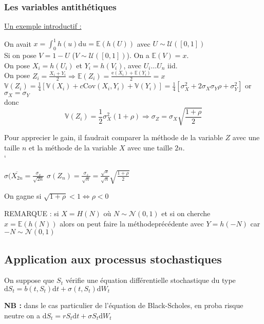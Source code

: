 \documentclass{report}
\newcommand{\E}{\mathbb{E}}
\newcommand{\Var}{\mathbb{V}}
\newcommand{\Cov}{\mathrm{Cov}}
\newcommand{\e}{\mbox{e}}
\newcommand{\dd}{\mathrm{d}}
\begin{document}
\subsubsection{Les variables antithétiques}
\underline{Un exemple introductif : }

\vspace{0.2cm}
On avait $x= \int_0^1h(u)\dd u = \E(h(U))$ avec $U\sim\mathcal{U}([0,1])$\\
Si on pose $V=1-U$ ($V\sim\mathcal{U}([0,1])$). On a $\E(V) = x$.\\
On pose $X_i = h(U_i)$ et $Y_i=h(V_i)$, avec $U_i\dots U_n$ iid.\\
On pose $Z_i = \displaystyle\frac{X_i+Y_i}{2}\Rightarrow\E(Z_i) = \displaystyle\frac{\e(X_i)+\E(Y_i)}{2}=x$\\
$\Var(Z_i) = \displaystyle\frac{1}{4}\left[\Var(X_i)+c\Cov(X_i, Y_i)+\Var(Y_i)\right] = \displaystyle\frac{1}{4}\left[\sigma^2_X+2\sigma_X\sigma_Y\rho+\sigma_Y^2\right]$ or $\sigma_X=\sigma_Y$\\
donc \[\Var(Z_i) = \displaystyle\frac{1}{2}\sigma_X^2(1+\rho)\Rightarrow\sigma_Z=\sigma_X\sqrt{\displaystyle\frac{1+\rho}{2}}\]

Pour apprecier le gain, il faudrait comparer la méthode de la variable $Z$ avec une taille $n$ et la méthode de la variable $X$ avec une taille $2n$.\\
`\begin{multicols}{2}
$\sigma(\overline{X_{2n}}=\displaystyle\frac{\sigma_x}{\sqrt{2n}}$
$\sigma(Z_n) = \displaystyle\frac{\sigma_z}{\sqrt{n}}=\displaystyle\frac{\sqrt{x}}{\sqrt{n}}\sqrt{\displaystyle\frac{1+\rho}{2}}$\\
\end{multicols}
On gagne si $\sqrt{1+\rho}<1\Leftrightarrow\rho<0$

\vspace{0.3cm}
REMARQUE : si $X = H(N)$ où $N\sim\mathcal{N}(0,1)$ et si on cherche $x=\E(h(N))$ alors on peut faire la méthodeprécédente avec $Y = h(-N)$ car $-N\sim\mathcal{N}(0,1)$


\subsection{Application aux processus stochastiques}
On suppose que $S_t$ vérifie une équation différentielle stochastique du type $\dd S_t=b(t,S_t)\dd t+\sigma(t,S_t)\dd W_t$

\vspace{0.1cm}
\textbf{NB : } dans le cas particulier de l'équation de Black-Scholes, en proba risque neutre on a $\dd S_t=rS_t\dd t+\sigma S_t\dd W_t$\\
\end{document}
